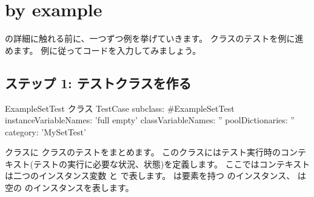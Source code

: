 \documentclass[a4paper,10pt,twoside]{book}
\begin{document}



\section{\sunit by example}

\SUnit の詳細に触れる前に、一つずつ例を挙げていきます。
 クラスのテストを例に進めます。
例に従ってコードを入力してみましょう。
\subsection{ステップ 1: テストクラスを作る}


\begin{classdef}[exampleSetTest]{ExampleSetTest クラス}
TestCase subclass: #ExampleSetTest
	instanceVariableNames: 'full empty'
	classVariableNames: ''
	poolDictionaries: ''
	category: 'MySetTest'
\end{classdef}

 クラスに  クラスのテストをまとめます。
このクラスにはテスト実行時のコンテキスト(テストの実行に必要な状況、状態)を定義します。
ここではコンテキストは二つのインスタンス変数  と  で表します。
 は要素を持つ  のインスタンス、 は空の  のインスタンスを表します。
\end{document}
